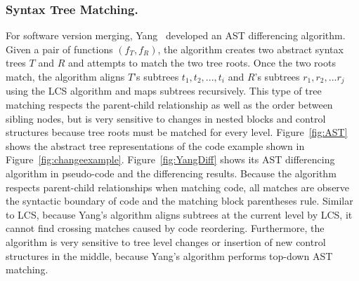
\subsubsection{Syntax Tree Matching.}
For software version merging, Yang~\cite{Yang1991} developed an AST differencing algorithm. Given a pair of functions $(f_T,f_R)$, the algorithm creates two abstract syntax trees $T$ and $R$ and attempts to match the two tree roots. Once the two roots match, the algorithm aligns $T$'s subtrees ${t_1, t_2, ..., t_i}$ and $R$'s subtrees ${r_1, r_2, ... r_j}$ using the LCS algorithm and maps subtrees recursively. This type of tree matching respects the parent-child relationship as well as the order between sibling nodes, but is very sensitive to changes in nested blocks and control structures because tree roots must be matched for every level. Figure~\ref{fig:AST} shows the abstract tree representations of the code example shown in Figure~\ref{fig:changeexample}. Figure~\ref{fig:YangDiff} shows its AST differencing algorithm in pseudo-code and the differencing results.  Because the algorithm respects parent-child relationships when matching code, all matches are observe the syntactic boundary of code and  the matching block parentheses rule. Similar to LCS, because Yang's algorithm aligns subtrees at the current level by LCS, it cannot find crossing matches caused by code reordering. Furthermore, the algorithm is very sensitive to tree level changes or insertion of new control structures in the middle, because Yang's algorithm performs top-down AST matching. 

